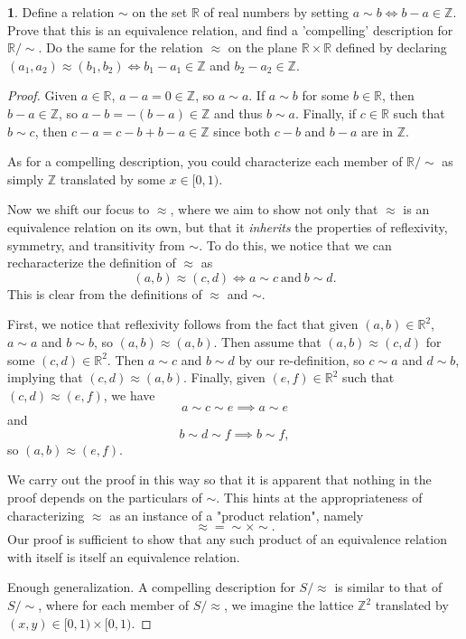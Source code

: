 \documentclass{article}
\newcounter{section-number}
\theoremstyle{definition}
\newtheorem{ex}{}[section-number]
\begin{document}
\begin{ex}
	Define a relation $\sim$ on the set $\mathbb{R}$ of real numbers by setting $a \sim b \iff b - a \in \mathbb{Z}$.
	Prove that this is an equivalence relation, and find a 'compelling' description for $\mathbb{R}/{\sim}$.
	Do the same for the relation $\approx$ on the plane $\mathbb{R} \times \mathbb{R}$ defined by declaring $(a_1, a_2) \approx (b_1, b_2) \iff b_1 - a_1 \in \mathbb{Z}$ and $b_2 - a_2 \in \mathbb{Z}$.
\end{ex}
\begin{proof}
	Given $a \in \mathbb{R}$, $a - a = 0 \in \mathbb{Z}$, so $a \sim a$.
	If $a \sim b$ for some $b \in \mathbb{R}$, then $b - a \in \mathbb{Z}$, so $a - b = -(b - a) \in \mathbb{Z}$ and thus $b \sim a$.
	Finally, if $c \in \mathbb{R}$ such that $b \sim c$, then $c - a = c - b + b - a \in \mathbb{Z}$ since both $c - b$ and $b - a$ are in $\mathbb{Z}$.

  As for a compelling description, you could characterize each member of $\mathbb{R}/{\sim}$ as simply $\mathbb{Z}$ translated by some $x \in [0, 1)$.

	Now we shift our focus to $\approx$, where we aim to show not only that $\approx$ is an equivalence relation on its own, but that it \textit{inherits} the properties of reflexivity, symmetry, and transitivity from $\sim$.
	To do this, we notice that we can recharacterize the definition of $\approx$ as \begin{equation*}
		(a, b) \approx (c, d) \iff a \sim c\ \mathrm{and}\ b \sim d.
	\end{equation*}
  This is clear from the definitions of $\approx$ and $\sim$.

  First, we notice that reflexivity follows from the fact that given $(a, b) \in \mathbb{R}^2$, $a \sim a$ and $b \sim b$, so $(a, b) \approx (a, b)$.
  Then assume that $(a, b) \approx (c, d)$ for some $(c, d) \in \mathbb{R}^2$.
  Then $a \sim c$ and $b \sim d$ by our re-definition, so $c \sim a$ and $d \sim b$, implying that $(c, d) \approx (a, b)$.
  Finally, given $(e, f) \in \mathbb{R}^2$ such that $(c, d) \approx (e, f)$, we have \begin{equation*}
    a \sim c \sim e \implies a \sim e
  \end{equation*}
  and \begin{equation*}
    b \sim d \sim f \implies b \sim f,
  \end{equation*}
  so $(a, b) \approx (e, f)$.

  We carry out the proof in this way so that it is apparent that nothing in the proof depends on the particulars of $\sim$.
  This hints at the appropriateness of characterizing $\approx$ as an instance of a "product relation", namely \begin{equation*}
    \approx = \sim \times \sim.
  \end{equation*}
  Our proof is sufficient to show that any such product of an equivalence relation with itself is itself an equivalence relation.

  Enough generalization.
  A compelling description for $S/{\approx}$ is similar to that of $S/{\sim}$, where for each member of $S/{\approx}$, we imagine the lattice $\mathbb{Z}^2$ translated by $(x, y) \in [0, 1) \times [0, 1)$.
\end{proof}
\end{document}

